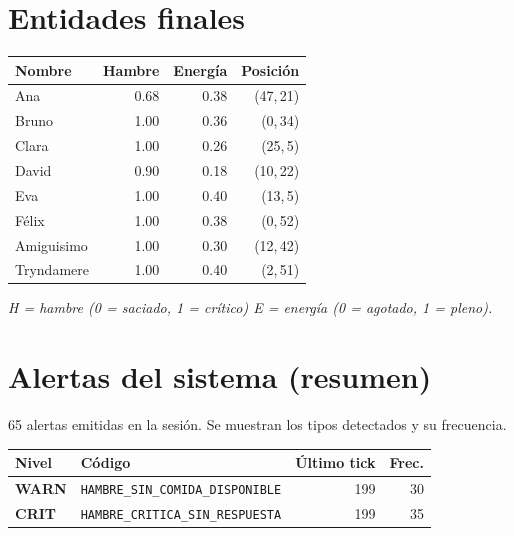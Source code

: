 \documentclass[12pt,a4paper]{article}
\begin{document}
\section*{Entidades finales}

\begin{tabular}{lrrr}
  \toprule
  \textbf{Nombre} & \textbf{Hambre} & \textbf{Energ\'ia} & \textbf{Posici\'on} \\
  \midrule
  Ana        & \textcolor{warncolor}{0.68} & 0.38                        & (47,\,21) \\
  Bruno      & \textcolor{critcolor}{1.00} & 0.36                        & (0,\,34)  \\
  Clara      & \textcolor{critcolor}{1.00} & 0.26                        & (25,\,5)  \\
  David      & \textcolor{critcolor}{0.90} & \textcolor{warncolor}{0.18} & (10,\,22) \\
  Eva        & \textcolor{critcolor}{1.00} & 0.40                        & (13,\,5)  \\
  F\'elix    & \textcolor{critcolor}{1.00} & 0.38                        & (0,\,52)  \\
  Amiguisimo & \textcolor{critcolor}{1.00} & 0.30                        & (12,\,42) \\
  Tryndamere & \textcolor{critcolor}{1.00} & 0.40                        & (2,\,51)  \\
  \bottomrule
\end{tabular}

\smallskip
\textit{\small H = hambre (0 = saciado, 1 = cr\'itico) \quad E = energ\'ia (0 = agotado, 1 = pleno).}

\section*{Alertas del sistema (resumen)}

\textcolor{textmuted}{\small 65 alertas emitidas en la sesi\'on. Se muestran los tipos detectados y su frecuencia.}

\vspace{6pt}

\begin{tabular}{llrr}
  \toprule
  \textbf{Nivel} & \textbf{C\'odigo} & \textbf{\'Ultimo tick} & \textbf{Frec.} \\
  \midrule
  \textcolor{warncolor}{\textbf{WARN}} & \texttt{HAMBRE\_SIN\_COMIDA\_DISPONIBLE}    & 199 & 30 \\
  \textcolor{critcolor}{\textbf{CRIT}} & \texttt{HAMBRE\_CRITICA\_SIN\_RESPUESTA}    & 199 & 35 \\
  \bottomrule
\end{tabular}
\end{document}

